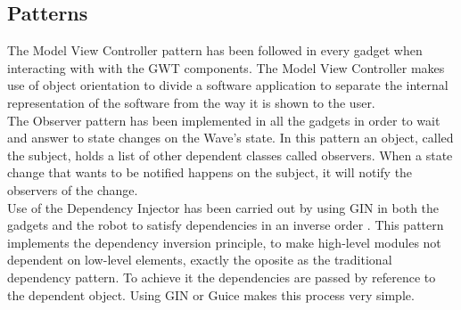 \subsection{Patterns}
The Model View Controller pattern has been followed in every gadget when interacting with with the GWT components. The Model View Controller makes use of object orientation to divide a software application to separate the internal representation of the software from the way it is shown to the user.\\[.2cm]
The Observer pattern has been implemented in all the gadgets in order to wait and answer to state changes on the Wave's state. In this pattern an object, called the subject, holds a list of other dependent classes called observers. When a state change that wants to be notified happens on the subject, it will notify the observers of the change.\\[.2cm]
Use of the Dependency Injector has been carried out by using GIN in both the gadgets and the robot to satisfy dependencies in an inverse order \cite{ref:dependency_injection}. This pattern implements the dependency inversion principle, to make high-level modules not dependent on low-level elements, exactly the oposite as the traditional dependency pattern. To achieve it the dependencies are passed by reference to the dependent object. Using GIN or Guice makes this process very simple.

